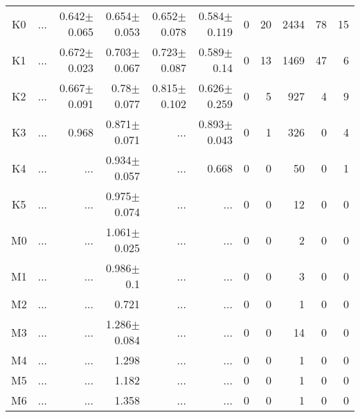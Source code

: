 \begin{table}[t]
\begin{center}
\begin{tabular}{c|rrrrr|rrrrr}
K0	&	 ...	&	0.642$\pm$0.065	&	0.654$\pm$0.053	&	0.652$\pm$0.078	&	0.584$\pm$0.119	&	0	&	20	&	2434	&	78	&	15	\\
K1	&	 ...	&	0.672$\pm$0.023	&	0.703$\pm$0.067	&	0.723$\pm$0.087	&	0.589$\pm$0.14	&	0	&	13	&	1469	&	47	&	6	\\
K2	&	 ...	&	0.667$\pm$0.091	&	0.78$\pm$0.077	&	0.815$\pm$0.102	&	0.626$\pm$0.259	&	0	&	5	&	927	&	4	&	9	\\
K3	&	 ...	&	0.968	&	0.871$\pm$0.071	&	 ...	&	0.893$\pm$0.043	&	0	&	1	&	326	&	0	&	4	\\
K4	&	 ...	&	 ...	&	0.934$\pm$0.057	&	 ...	&	0.668	&	0	&	0	&	50	&	0	&	1	\\
K5	&	 ...	&	 ...	&	0.975$\pm$0.074	&	 ...	&	 ...	&	0	&	0	&	12	&	0	&	0	\\
M0	&	 ...	&	 ...	&	1.061$\pm$0.025	&	 ...	&	 ...	&	0	&	0	&	2	&	0	&	0	\\
M1	&	 ...	&	 ...	&	0.986$\pm$0.1	&	 ...	&	 ...	&	0	&	0	&	3	&	0	&	0	\\
M2	&	 ...	&	 ...	&	0.721	&	 ...	&	 ...	&	0	&	0	&	1	&	0	&	0	\\
M3	&	 ...	&	 ...	&	1.286$\pm$0.084	&	 ...	&	 ...	&	0	&	0	&	14	&	0	&	0	\\
M4	&	 ...	&	 ...	&	1.298	&	 ...	&	 ...	&	0	&	0	&	1	&	0	&	0	\\
M5	&	 ...	&	 ...	&	1.182	&	 ...	&	 ...	&	0	&	0	&	1	&	0	&	0	\\
M6	&	 ...	&	 ...	&	1.358	&	 ...	&	 ...	&	0	&	0	&	1	&	0	&	0	\\
    \bottomrule
    \end{tabular}
\end{center}
\end{table}



